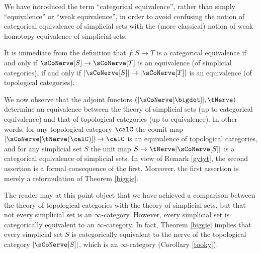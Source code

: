 \begin{remark}
We have introduced the term ``categorical equivalence'', rather than simply ``equivalence'' or ``weak equivalence'', in order to avoid confusing the notion of categorical equivalence of simplicial sets with the (more classical) notion of weak homotopy equivalence of simplicial sets.
\end{remark}

\begin{remark}\label{gytyt}
It is immediate from the definition that $f: S \rightarrow T$ is a categorical equivalence if and only if
$\sCoNerve[S] \rightarrow \sCoNerve[T]$ is an equivalence (of simplicial categories), if and only if $|\sCoNerve[S]| \rightarrow |\sCoNerve[T]|$ is an equivalence (of topological categories).
\end{remark}

We now observe that the adjoint functors $(|\sCoNerve[ \bigdot ]|, \tNerve )$
determine an equivalence between the theory of simplicial sets (up to categorical equivalence)
and that of topological categories (up to equivalence). In other words, for any
topological category $\calC$ the counit map
$|\sCoNerve[ \tNerve(\calC)] | \rightarrow \calC$ is an equivalence of topological categories, and for any simplicial set $S$ the unit map
$S \rightarrow \tNerve |\sCoNerve[S]|$
is a categorical equivalence of simplicial sets. In view of Remark \ref{gytyt}, the second assertion is a formal consequence of the first. Moreover, the first assertion is merely a reformulation of Theorem \ref{biggie}.

\begin{remark}
The reader may at this point object that we have achieved a comparison between the theory of topological categories with the theory of simplicial sets, but that not every simplicial set is an $\infty$-category. However, every simplicial set is categorically equivalent to an $\infty$-category. In fact, Theorem \ref{biggie} implies that every simplicial set $S$ is categorically equivalent to the nerve of the topological category $| \sCoNerve[S] |$, which is an $\infty$-category (Corollary \ref{tooky}).
\end{remark}






